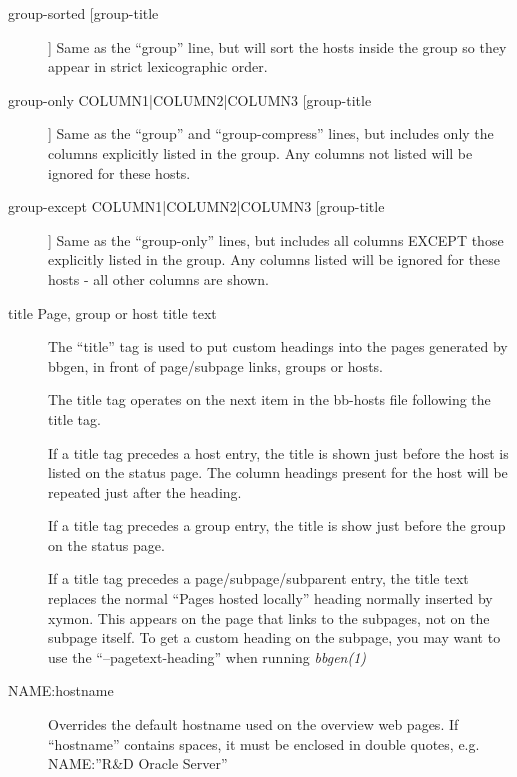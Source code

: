 \begin{description}
 

\item[group-sorted [group-title]] Same as the ``group'' line, but will
  sort the hosts inside the group so they appear in strict
  lexicographic order. 


 

\item[group-only COLUMN1|COLUMN2|COLUMN3 [group-title]] Same as the
  ``group'' and ``group-compress'' lines, but includes only the
  columns explicitly listed in the group. Any columns not listed will
  be ignored for these hosts. 


 

\item[group-except COLUMN1|COLUMN2|COLUMN3 [group-title]] Same as the
  ``group-only'' lines, but includes all columns EXCEPT those
  explicitly listed in the group. Any columns listed will be ignored
  for these hosts - all other columns are shown. 


 

\item[title Page, group or host title text] The ``title'' tag is used
  to put custom headings into the pages generated by bbgen, in front
  of page/subpage links, groups or hosts. 


  The title tag operates on the next item in the bb-hosts file following the title tag. 


  If a title tag precedes a host entry, the title is shown just before
  the host is listed on the status page. The column headings present
  for the host will be repeated just after the heading. 



  If a title tag precedes a group entry, the title is show just before the group on the status page. 


  If a title tag precedes a page/subpage/subparent entry, the title
  text replaces the normal ``Pages hosted locally'' heading normally
  inserted by xymon. This appears on the page that links to the
  subpages, not on the subpage itself. To get a custom heading on the
  subpage, you may want to use the ``--pagetext-heading'' when running
  \emph{bbgen(1)}




 

\item[NAME:hostname] Overrides the default hostname used on the
  overview web pages. If ``hostname'' contains spaces, it must be
  enclosed in double quotes, e.g. NAME:''R\&D Oracle Server'' 



\end{description}
